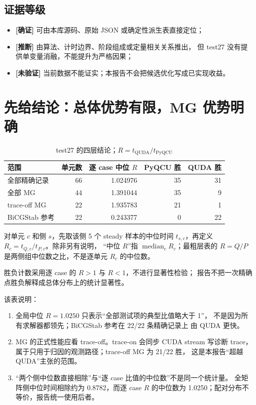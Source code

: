 \documentclass[UTF8,a4paper,11pt]{ctexart}
\newcommand{\confirmed}{\textcolor{evidencegreen}{\textbf{[确证]}}}
\newcommand{\inferred}{\textcolor{warnorange}{\textbf{[推断]}}}
\newcommand{\unverified}{\textcolor{qudared}{\textbf{[未验证]}}}
\begin{document}
\subsection{证据等级}

\begin{itemize}[leftmargin=2em]
  \item \confirmed{} 可由本库源码、原始 JSON 或确定性派生表直接定位；
  \item \inferred{} 由算法、计时边界、阶段组成或定量相关关系推出，
        但 test27 没有提供单变量消融，不能提升为严格因果；
  \item \unverified{} 当前数据不能证实；本报告不会把候选优化写成已实现收益。
\end{itemize}

\section{先给结论：总体优势有限，MG 优势明确}

\begin{table}[htbp]
\centering
\caption{test27 的四层结论；$R=t_{\mathrm{QUDA}}/t_{\mathrm{PyQCU}}$}
\small
\begin{tabular}{@{}lrrrr@{}}
\toprule
范围 & 单元数 & 逐 case 中位 $R$ & PyQCU 胜 & QUDA 胜 \\
\midrule
全部精确记录 & 66 & 1.024976 & 35 & 31 \\
全部 MG & 44 & 1.391044 & 35 & 9 \\
trace-off MG & 22 & 1.935783 & 21 & 1 \\
BiCGStab 参考 & 22 & 0.243377 & 0 & 22 \\
\bottomrule
\end{tabular}
\end{table}

对单元 $c$ 和侧 $s$，先取该侧 5 个 steady 样本的中位时间
$t_{s,c}$，再定义 $R_c=t_{Q,c}/t_{P,c}$。除非另有说明，
“中位 $R$”指 $\operatorname{median}_c R_c$；最粗层表的
$R=Q/P$ 是两侧组中位数之比，不是逐单元 $R_c$ 的中位数。

胜负计数采用逐 case 的 $R>1$ 与 $R<1$，不进行显著性检验；
报告不把一次精确点胜负解释成总体分布上的统计显著性。

该表说明：

\begin{enumerate}[leftmargin=2em]
  \item 全局中位 $R=1.0250$ 只表示“全部测试项的典型比值略大于 1”，
        不是因为所有求解器都领先；BiCGStab 参考在 22/22 条精确记录上
        由 QUDA 更快。
  \item MG 的正式性能应看 trace-off。trace-on 会同步 CUDA stream 写诊断
        trace，属于只用于归因的观测路径；trace-off MG 为 21/22 胜，
        这是本报告“超越 QUDA”主张的范围。
  \item “两个侧中位数直接相除”与“逐 case 比值的中位数”不是同一个统计量。
        全矩阵侧中位时间相除约为 0.8782，而逐 case $R$ 的中位数为
        1.0250；配对分布不等价，报告统一使用后者。
\end{enumerate}
\end{document}

